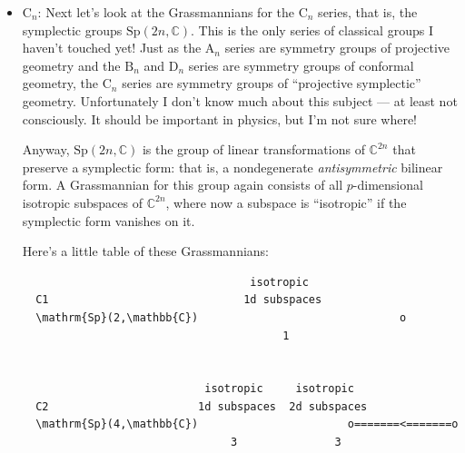 \documentclass{article}
\begin{document}
\begin{itemize}
\begin{verbatim}
  B3                   vectors       bivectors       spinors
  \mathrm{Spin}(7,\mathbb{C})              o--------------o======\Rightarrow=======o
                         7             21               8



  B4             vectors     bivectors        3-vectors      spinors
  \mathrm{Spin}(9,\mathbb{C})        o-------------o---------------o======\Rightarrow======o
                   9            36              84             16
\end{verbatim}

  As before, the dimension of the space of \(p\)-vectors in
  \(q\)-dimensional space comes straight from Pascal's triangle: it's
  \(q\) choose \(p\). But now we also have spinor reps; the dimensions
  of these are powers of 2.
\item
  \(\mathrm{C}_n\): Next let's look at the Grassmannians for the
  \(\mathrm{C}_n\) series, that is, the symplectic groups
  \(\mathrm{Sp}(2n,\mathbb{C})\). This is the only series of classical
  groups I haven't touched yet! Just as the \(\mathrm{A}_n\) series are
  symmetry groups of projective geometry and the \(\mathrm{B}_n\) and
  \(\mathrm{D}_n\) series are symmetry groups of conformal geometry, the
  \(\mathrm{C}_n\) series are symmetry groups of ``projective
  symplectic'' geometry. Unfortunately I don't know much about this
  subject --- at least not consciously. It should be important in
  physics, but I'm not sure where!

  Anyway, \(\mathrm{Sp}(2n,\mathbb{C})\) is the group of linear
  transformations of \(\mathbb{C}^{2n}\) that preserve a symplectic
  form: that is, a nondegenerate \emph{antisymmetric} bilinear form. A
  Grassmannian for this group again consists of all \(p\)-dimensional
  isotropic subspaces of \(\mathbb{C}^{2n}\), where now a subspace is
  ``isotropic'' if the symplectic form vanishes on it.

  Here's a little table of these Grassmannians:

\begin{verbatim}
                                   isotropic 
  C1                              1d subspaces
  \mathrm{Sp}(2,\mathbb{C})                               o
                                        1


                            isotropic     isotropic          
  C2                       1d subspaces  2d subspaces
  \mathrm{Sp}(4,\mathbb{C})                       o=======<=======o
                                3               3



\end{verbatim}
\end{itemize}
\end{document}
